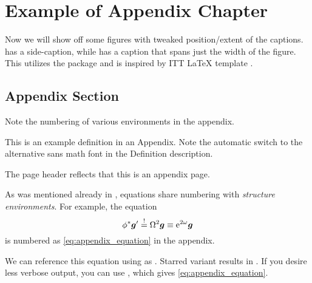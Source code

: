 \chapter{Example of Appendix Chapter} \label{appendix:example}

\begin{example}
    Now we will show off some figures with tweaked position/extent of the captions.
     has a side-caption, while  has a caption that spans just the width of the figure.
    This utilizes the  package and is inspired by ITT \LaTeX{} template \autocite{ITTtemplate}.
\end{example}



\section{Appendix Section}%
\label{sec:Appendix Section}

Note the numbering of various environments in the appendix.

\begin{definition}
    This is an example definition in an Appendix.
    Note the automatic switch to the alternative sans math font in the Definition description.
\end{definition}

\begin{remark}
    The page header reflects that this is an appendix page.
\end{remark}

\begin{example}
    As was mentioned already in , equations share numbering with \emph{structure environments}. For example, the equation
    \begin{equation} \label{eq:appendix_equation}
        \phi^{*}\bm{g}' \overset{!}{=} \Omega^{2}\bm{g} \equiv \E*^{2\omega}\bm{g}
    \end{equation}
    is numbered as \eqref{eq:appendix_equation} in the appendix.

    We can reference this equation using \custommacro{\Cref} as .
    Starred variant \custommacro{\Cref*} results in .
    If you desire less verbose output, you can use \macro{\eqref}, which gives \eqref{eq:appendix_equation}.
\end{example}
